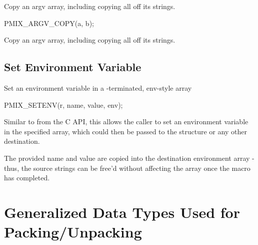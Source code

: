 \summary

Copy an argv array, including copying all off its strings.

\cspecificstart
\begin{codepar}
PMIX_ARGV_COPY(a, b);
\end{codepar}
\cspecificend

\begin{arglist}
\end{arglist}

\descr

Copy an argv array, including copying all off its strings.


\subsection{Set Environment Variable}

\summary

Set an environment variable in a -terminated, env-style array

\cspecificstart
\begin{codepar}
PMIX_SETENV(r, name, value, env);
\end{codepar}
\cspecificend


\begin{arglist}
\end{arglist}

\descr

Similar to  from the C API, this allows the caller to set an environment variable in the specified  array, which could then be passed to the  structure or any other destination.

\adviceuserstart
The provided name and value are copied into the destination environment array - thus, the source strings can be free'd without affecting the array once the macro has completed.
\adviceuserend


\section{Generalized Data Types Used for Packing/Unpacking}

